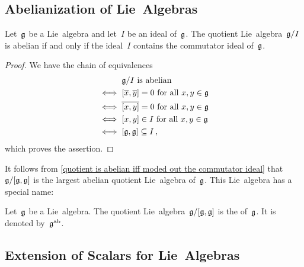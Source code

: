 \subsection{Abelianization of Lie~Algebras}


\begin{proposition}
	\label{quotient is abelian iff moded out the commutator ideal}
	Let~$\mathfrak{g}$ be a Lie~algebra and let~$I$ be an ideal of~$\mathfrak{g}$.
	The quotient Lie~algebra~$\mathfrak{g} / I$ is abelian if and only if the ideal~$I$ contains the commutator ideal of~$\mathfrak{g}$.
\end{proposition}


\begin{proof}
	We have the chain of equivalences
	\begin{align*}
		{}&
		\text{$\mathfrak{g} / I$ is abelian}
		\\
		\iff{}&
		\text{$[ \overline{x}, \overline{y}] = 0$ for all~$x, y \in \mathfrak{g}$}
		\\
		\iff{}&
		\text{$\overline{[x,y]} = 0$ for all~$x, y \in \mathfrak{g}$}
		\\
		\iff{}&
		\text{$[x,y] \in I$ for all~$x, y \in \mathfrak{g}$}
		\\
		\iff{}&
		[\mathfrak{g}, \mathfrak{g}] \subseteq I \,,
	\end{align*}
	which proves the assertion.
\end{proof}


\begin{fluff}
	It follows from \cref{quotient is abelian iff moded out the commutator ideal} that~$\mathfrak{g} / [\mathfrak{g}, \mathfrak{g}]$ is the largest abelian quotient Lie~algebra of~$\mathfrak{g}$.
	This Lie~algebra has a special name:
\end{fluff}


\begin{definition}
	Let~$\mathfrak{g}$ be a Lie~algebra.
	The quotient Lie~algebra~$\mathfrak{g} / [\mathfrak{g}, \mathfrak{g}]$ is the  of~$\mathfrak{g}$.
	It is denoted by~$\mathfrak{g}^{\mathrm{ab}}$.
\end{definition}


\subsection{Extension of Scalars for Lie~Algebras}


